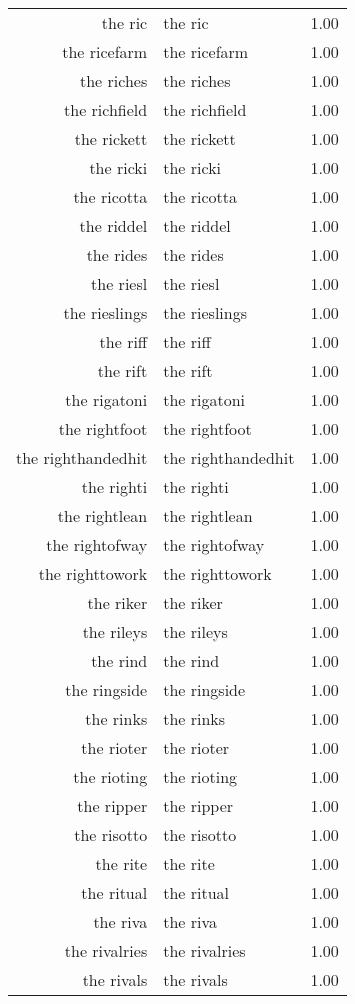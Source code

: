 \begin{table}[ht]
\begin{tabular}{rlr}
  the ric & the ric & 1.00 \\ 
  the ricefarm & the ricefarm & 1.00 \\ 
  the riches & the riches & 1.00 \\ 
  the richfield & the richfield & 1.00 \\ 
  the rickett & the rickett & 1.00 \\ 
  the ricki & the ricki & 1.00 \\ 
  the ricotta & the ricotta & 1.00 \\ 
  the riddel & the riddel & 1.00 \\ 
  the rides & the rides & 1.00 \\ 
  the riesl & the riesl & 1.00 \\ 
  the rieslings & the rieslings & 1.00 \\ 
  the riff & the riff & 1.00 \\ 
  the rift & the rift & 1.00 \\ 
  the rigatoni & the rigatoni & 1.00 \\ 
  the rightfoot & the rightfoot & 1.00 \\ 
  the righthandedhit & the righthandedhit & 1.00 \\ 
  the righti & the righti & 1.00 \\ 
  the rightlean & the rightlean & 1.00 \\ 
  the rightofway & the rightofway & 1.00 \\ 
  the righttowork & the righttowork & 1.00 \\ 
  the riker & the riker & 1.00 \\ 
  the rileys & the rileys & 1.00 \\ 
  the rind & the rind & 1.00 \\ 
  the ringside & the ringside & 1.00 \\ 
  the rinks & the rinks & 1.00 \\ 
  the rioter & the rioter & 1.00 \\ 
  the rioting & the rioting & 1.00 \\ 
  the ripper & the ripper & 1.00 \\ 
  the risotto & the risotto & 1.00 \\ 
  the rite & the rite & 1.00 \\ 
  the ritual & the ritual & 1.00 \\ 
  the riva & the riva & 1.00 \\ 
  the rivalries & the rivalries & 1.00 \\ 
  the rivals & the rivals & 1.00 \\ 

\end{tabular}
\end{table}
